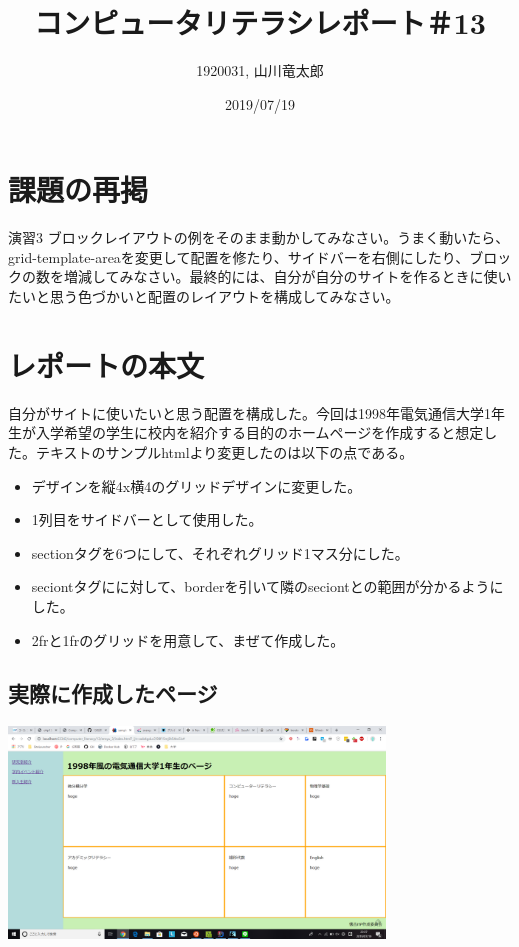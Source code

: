 \documentclass[12pt,a4j]{jarticle}
\begin{document}
\title{コンピュータリテラシレポート＃13}
\author{1920031, 山川竜太郎}
\date{2019/07/19}
\maketitle


\section{課題の再掲}
演習3 ブロックレイアウトの例をそのまま動かしてみなさい。うまく動いたら、grid-template-areaを変更して配置を修たり、サイドバーを右側にしたり、ブロックの数を増減してみなさい。最終的には、自分が自分のサイトを作るときに使いたいと思う色づかいと配置のレイアウトを構成してみなさい。

\section{レポートの本文}

自分がサイトに使いたいと思う配置を構成した。今回は1998年電気通信大学1年生が入学希望の学生に校内を紹介する目的のホームページを作成すると想定した。テキストのサンプルhtmlより変更したのは以下の点である。

\begin{itemize}
  \item デザインを縦4x横4のグリッドデザインに変更した。
  \item 1列目をサイドバーとして使用した。
  \item sectionタグを6つにして、それぞれグリッド1マス分にした。
  \item seciontタグにに対して、borderを引いて隣のseciontとの範囲が分かるようにした。
  \item 2frと1frのグリッドを用意して、まぜて作成した。
\end{itemize}

\subsection{実際に作成したページ}

\begin{center}
  \includegraphics[width=10cm]{./ensyu_3/image.png}
\end{center}
\end{document}
